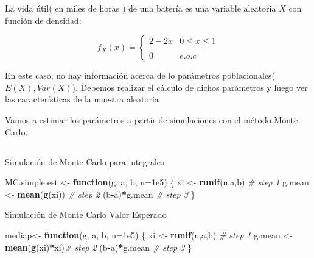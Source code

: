\documentclass[
  ignorenonframetext,
]{beamer}
\newenvironment{Shaded}{\begin{snugshade}}{\end{snugshade}}
\newcommand{\CommentTok}[1]{\textcolor[rgb]{0.56,0.35,0.01}{\textit{#1}}}
\newcommand{\ControlFlowTok}[1]{\textcolor[rgb]{0.13,0.29,0.53}{\textbf{#1}}}
\newcommand{\DataTypeTok}[1]{\textcolor[rgb]{0.13,0.29,0.53}{#1}}
\newcommand{\FloatTok}[1]{\textcolor[rgb]{0.00,0.00,0.81}{#1}}
\newcommand{\KeywordTok}[1]{\textcolor[rgb]{0.13,0.29,0.53}{\textbf{#1}}}
\newcommand{\NormalTok}[1]{#1}
\newcommand{\OperatorTok}[1]{\textcolor[rgb]{0.81,0.36,0.00}{\textbf{#1}}}
\newcommand{\StringTok}[1]{\textcolor[rgb]{0.31,0.60,0.02}{#1}}
\begin{document}
\begin{frame}{}

\justifying La vida útil( en miles de horas ) de una batería es una
variable aleatoria \(X\) con función de densidad:

\[f_X (x)=\left\{\begin{matrix}
 2-2x& 0\leq  x\leq 1\\ 
 & \\ 
 0& e.o.c 
\end{matrix}\right.
\]

En este caso, no hay información acerca de lo parámetros poblacionales(
\(E(X), Var(X)\)). Debemos realizar el cálculo de dichos parámetros y
luego ver las características de la muestra aleatoria

Vamos a estimar los parámetros a partir de simulaciones con el método
Monte Carlo.

\end{frame}

\hypertarget{section-6}{%
\subsection{}\label{section-6}}

\begin{frame}[fragile]{}

Simulación de Monte Carlo para integrales

\begin{Shaded}
\begin{Highlighting}[]
\NormalTok{ MC.simple.est <-}\StringTok{ }\ControlFlowTok{function}\NormalTok{(g, a, b, }\DataTypeTok{n=}\FloatTok{1e5}\NormalTok{) \{}
\NormalTok{   xi <-}\StringTok{ }\KeywordTok{runif}\NormalTok{(n,a,b)      }\CommentTok{# step 1}
\NormalTok{   g.mean <-}\StringTok{ }\KeywordTok{mean}\NormalTok{(}\KeywordTok{g}\NormalTok{(xi))   }\CommentTok{# step 2}
\NormalTok{   (b}\OperatorTok{-}\NormalTok{a)}\OperatorTok{*}\NormalTok{g.mean            }\CommentTok{# step 3}
\NormalTok{ \}}
\end{Highlighting}
\end{Shaded}

Simulación de Monte Carlo Valor Esperado

\begin{Shaded}
\begin{Highlighting}[]
\NormalTok{ mediap<-}\StringTok{ }\ControlFlowTok{function}\NormalTok{(g, a, b, }\DataTypeTok{n=}\FloatTok{1e5}\NormalTok{) \{}
\NormalTok{    xi <-}\StringTok{ }\KeywordTok{runif}\NormalTok{(n,a,b)      }\CommentTok{# step 1}
\NormalTok{    g.mean <-}\StringTok{ }\KeywordTok{mean}\NormalTok{(}\KeywordTok{g}\NormalTok{(xi)}\OperatorTok{*}\NormalTok{xi)}\CommentTok{# step 2}
\NormalTok{    (b}\OperatorTok{-}\NormalTok{a)}\OperatorTok{*}\NormalTok{g.mean            }\CommentTok{# step 3}
\NormalTok{ \}}
\end{Highlighting}
\end{Shaded}

\end{frame}
\end{document}
